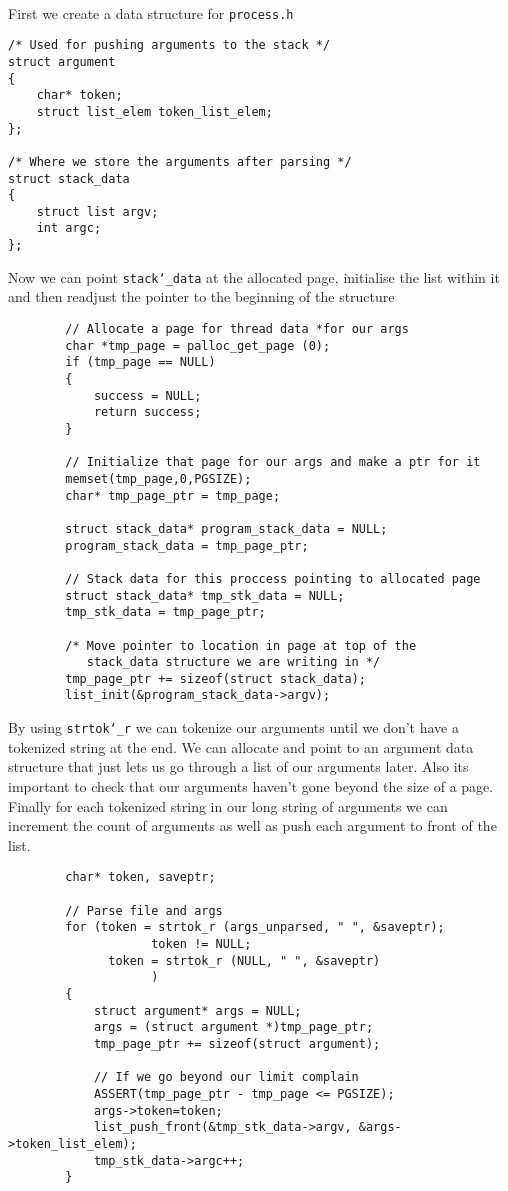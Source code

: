 \documentclass[]{article}
\begin{document}
   \texttt{}\\
   First we create a data structure for \texttt{process.h}\\
    \lstset{language=C, tabsize=2}    
    \begin{lstlisting}   
/* Used for pushing arguments to the stack */
struct argument
{
	char* token;
	struct list_elem token_list_elem;
};

/* Where we store the arguments after parsing */
struct stack_data
{
	struct list argv;
	int argc;
};
   \end{lstlisting}
   \newpage
   Now we can point \texttt{stack\char`_data} at the allocated page, initialise the list within it and then readjust the pointer to the beginning of the structure\\
    \lstset{language=C, tabsize=2}    
    \begin{lstlisting}
		// Allocate a page for thread data *for our args
		char *tmp_page = palloc_get_page (0);
		if (tmp_page == NULL)
		{
			success = NULL;
			return success;
		} 

		// Initialize that page for our args and make a ptr for it
		memset(tmp_page,0,PGSIZE);
		char* tmp_page_ptr = tmp_page;
		
		struct stack_data* program_stack_data = NULL;
  		program_stack_data = tmp_page_ptr;
		
		// Stack data for this proccess pointing to allocated page
		struct stack_data* tmp_stk_data = NULL;
		tmp_stk_data = tmp_page_ptr;
		
		/* Move pointer to location in page at top of the 
		   stack_data structure we are writing in */
		tmp_page_ptr += sizeof(struct stack_data);
		list_init(&program_stack_data->argv);
    \end{lstlisting}    
    \newpage
    By using \texttt{strtok\char`_r} we can tokenize our arguments until we don't have a tokenized string at the end. We can allocate and point to an argument data structure that just lets us go through a list of our arguments later. Also its important to check that our arguments haven't gone beyond the size of a page. Finally for each tokenized string in our long string of arguments we can increment the count of arguments as well as push each argument to front of the list.
    
    \lstset{language=C,tabsize=2}
    \begin{lstlisting}
		char* token, saveptr;

		// Parse file and args
		for (token = strtok_r (args_unparsed, " ", &saveptr); 
					token != NULL;
		      token = strtok_r (NULL, " ", &saveptr)
					)
		{
			struct argument* args = NULL;
			args = (struct argument *)tmp_page_ptr;
			tmp_page_ptr += sizeof(struct argument);
			
			// If we go beyond our limit complain
			ASSERT(tmp_page_ptr - tmp_page <= PGSIZE);
			args->token=token;
			list_push_front(&tmp_stk_data->argv, &args->token_list_elem);
			tmp_stk_data->argc++;			
		}
    \end{lstlisting}
    \newpage
    
\end{document}
